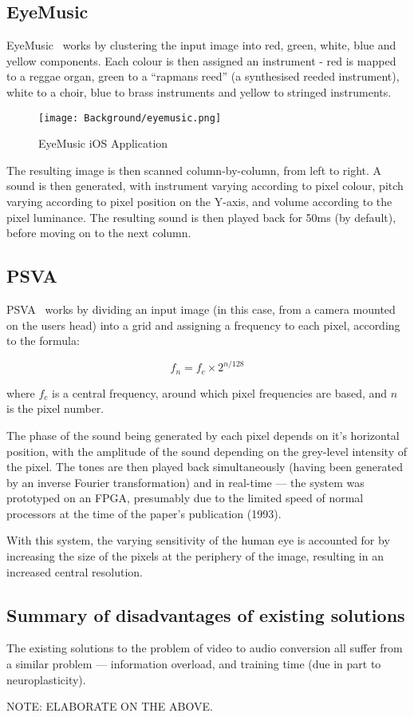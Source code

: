 \subsection{EyeMusic}
EyeMusic~\cite{abboud2014eyemusic} works by clustering the input image into red, green, white, blue and yellow components. Each colour is then assigned an instrument - red is mapped to a reggae organ, green to a ``rapmans reed'' (a synthesised reeded instrument), white to a choir, blue to brass instruments and yellow to stringed instruments.

\begin{figure}[H]
    \centering
    \texttt{[image: Background/eyemusic.png]}
    \caption{EyeMusic iOS Application}
\end{figure}

The resulting image is then scanned column-by-column, from left to right. A sound is then generated, with instrument varying according to pixel colour, pitch varying according to pixel position on the Y-axis, and volume according to the pixel luminance. The resulting sound is then played back for 50ms (by default), before moving on to the next column. 

\subsection{PSVA}
\ac{PSVA}~\cite{412057} works by dividing an input image (in this case, from a camera mounted on the users head) into a grid and assigning a frequency to each pixel, according to the formula:

\begin{equation}
    f_{n} = f_{c} \times 2^{n/128}
\end{equation}

where $f_{c}$ is a central frequency, around which pixel frequencies are based, and $n$ is the pixel number. 

The phase of the sound being generated by each pixel depends on it's horizontal position, with the amplitude of the sound depending on the grey-level intensity of the pixel. The tones are then played back simultaneously (having been generated by an inverse Fourier transformation) and in real-time --- the system was prototyped on an \ac{FPGA}, presumably due to the limited speed of normal processors at the time of the paper's publication (1993). 

With this system, the varying sensitivity of the human eye is accounted for by increasing the size of the pixels at the periphery of the image, resulting in an increased central resolution.

\subsection{Summary of disadvantages of existing solutions}
The existing solutions to the problem of video to audio conversion all suffer from a similar problem --- information overload, and training time (due in part to neuroplasticity).

NOTE: ELABORATE ON THE ABOVE.
